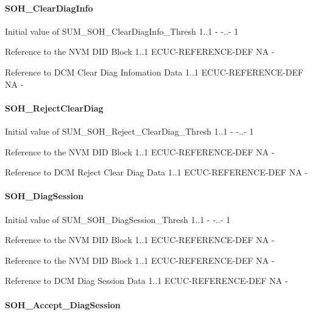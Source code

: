 \paragraph{SOH_ClearDiagInfo}

{
{Initial value of SUM_SOH_ClearDiagInfo_Thresh}
{1..1}
{-}
{-..-}
{1}}

{
{Reference to the NVM DID Block}
{1..1}
{ECUC-REFERENCE-DEF}
{NA}
{-}}

{
{Reference to DCM Clear Diag Infomation Data}
{1..1}
{ECUC-REFERENCE-DEF}
{NA}
{-}}

\paragraph{SOH_RejectClearDiag}

{
{Initial value of SUM_SOH_Reject_ClearDiag_Thresh}
{1..1}
{-}
{-..-}
{1}}

{
{Reference to the NVM DID Block}
{1..1}
{ECUC-REFERENCE-DEF}
{NA}
{-}}

{
{Reference to DCM Reject Clear Diag Data}
{1..1}
{ECUC-REFERENCE-DEF}
{NA}
{-}}

\paragraph{SOH_DiagSession}

{
{Initial value of SUM_SOH_DiagSession_Thresh}
{1..1}
{-}
{-..-}
{1}}

{
{Reference to the NVM DID Block}
{1..1}
{ECUC-REFERENCE-DEF}
{NA}
{-}}

{
{Reference to the NVM DID Block}
{1..1}
{ECUC-REFERENCE-DEF}
{NA}
{-}}

{
{Reference to DCM Diag Session Data}
{1..1}
{ECUC-REFERENCE-DEF}
{NA}
{-}}

\paragraph{SOH_Accept_DiagSession}

